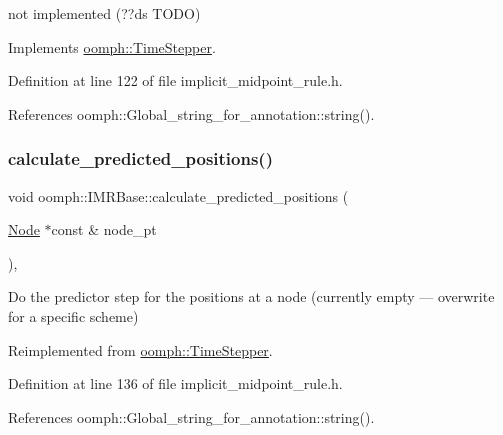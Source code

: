 not implemented (??ds T\+O\+DO) 



Implements \hyperlink{classoomph_1_1TimeStepper_a7e894df13c88c96dd8eced2700228225}{oomph\+::\+Time\+Stepper}.



Definition at line 122 of file implicit\+\_\+midpoint\+\_\+rule.\+h.



References oomph\+::\+Global\+\_\+string\+\_\+for\+\_\+annotation\+::string().

\mbox{\label{classoomph_1_1IMRBase_ac206f72b8054828b715756417dcd230a}} 
\subsubsection{\texorpdfstring{calculate\+\_\+predicted\+\_\+positions()}{calculate\_predicted\_positions()}}
{\footnotesize\ttfamily void oomph\+::\+I\+M\+R\+Base\+::calculate\+\_\+predicted\+\_\+positions (\begin{DoxyParamCaption}\item[{\hyperlink{classoomph_1_1Node}{Node} $\ast$const \&}]{node\+\_\+pt }\end{DoxyParamCaption})\hspace{0.3cm}{\ttfamily [inline]}, {\ttfamily [virtual]}}



Do the predictor step for the positions at a node (currently empty --- overwrite for a specific scheme) 



Reimplemented from \hyperlink{classoomph_1_1TimeStepper_a2e7fafceb9330ac971078cf9dc248701}{oomph\+::\+Time\+Stepper}.



Definition at line 136 of file implicit\+\_\+midpoint\+\_\+rule.\+h.



References oomph\+::\+Global\+\_\+string\+\_\+for\+\_\+annotation\+::string().

\mbox{\label{classoomph_1_1IMRBase_a1512b1a47e5b6dc6c8540fd024c44d1d}} 
